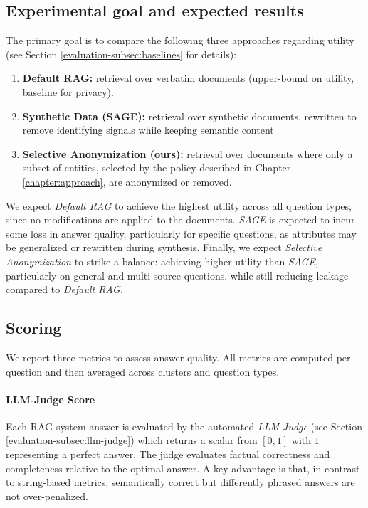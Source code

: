 \subsection{Experimental goal and expected results}
The primary goal is to compare the following three approaches regarding utility (see Section \ref{evaluation-subsec:baselines} for details):
\begin{enumerate}
\item \textbf{Default RAG:} retrieval over verbatim documents (upper-bound on utility, baseline for privacy).
\item \textbf{Synthetic Data (SAGE):} retrieval over synthetic documents, rewritten to remove identifying signals while keeping semantic content
\item \textbf{Selective Anonymization (ours):} retrieval over documents where only a subset of entities, selected by the policy described in Chapter \ref{chapter:approach}, are anonymized or removed.
\end{enumerate}

We expect \textit{Default RAG} to achieve the highest utility across all question types, since no modifications are applied to the documents. \textit{SAGE} is expected to incur some loss in answer quality, particularly for specific questions, as attributes may be generalized or rewritten during synthesis. Finally, we expect \textit{Selective Anonymization} to strike a balance: achieving higher utility than \textit{SAGE}, particularly on general and multi-source questions, while still reducing leakage compared to \textit{Default RAG}.


\subsection{Scoring} 
We report three metrics to assess answer quality. All metrics are computed per question and then averaged across clusters and question types.
\paragraph{LLM-Judge Score} Each \ac{RAG}-system answer is evaluated by the automated \textit{LLM-Judge} (see Section \ref{evaluation-subsec:llm-judge}) which returns a scalar from $[0,1]$ with $1$ representing a perfect answer. The judge evaluates factual correctness and completeness relative to the optimal answer. A key advantage is that,  in contrast to string-based metrics,  semantically correct but differently phrased answers are not over-penalized.

